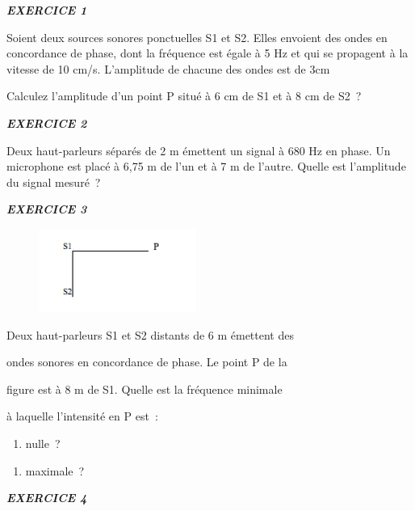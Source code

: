 {\emph{\textbf{EXERCICE 1}}

Soient deux sources sonores ponctuelles S1 et S2. Elles envoient des
ondes en concordance de phase, dont la fréquence est égale à 5 Hz et qui
se propagent à la vitesse de 10 cm/s. L'amplitude de chacune des ondes
est de 3cm

Calculez l'amplitude d'un point P situé à 6 cm de S1 et à 8 cm de S2~?

\emph{\textbf{EXERCICE 2}}

Deux haut-parleurs séparés de 2 m émettent un signal à 680 Hz en phase.
Un microphone est placé à 6,75 m de l'un et à 7 m de l'autre. Quelle est
l'amplitude du signal mesuré~?

\emph{\textbf{EXERCICE 3}}

\begin{figure}
\centering
\includegraphics[width=5.151cm,height=2.729cm]{Pictures/10000001000000BC000000630AF71C86AA2A0A65.png}
\caption{}
\end{figure}

Deux haut-parleurs S1 et S2 distants de 6 m émettent des

ondes sonores en concordance de phase. Le point P de la

figure est à 8 m de S1. Quelle est la fréquence minimale

à laquelle l'intensité en P est~:

\begin{enumerate}
\def\labelenumi{\alph{enumi})}
\tightlist
\item
  nulle~?
\end{enumerate}

\begin{enumerate}
\def\labelenumi{\alph{enumi})}
\tightlist
\item
  maximale~?
\end{enumerate}

\emph{\textbf{EXERCICE 4}}

}
